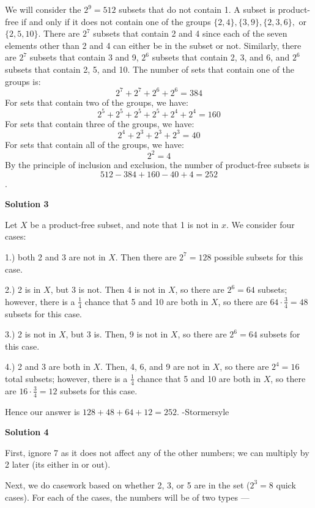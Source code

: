 \begin{enumerate}
We will consider the $2^9 = 512$ subsets that do not contain 1. A subset is product-free if and only if it does not contain one of the groups $\{2, 4\}, \{3, 9\}, \{2, 3, 6\},$ or $\{2, 5, 10\}$. There are $2^7$ subsets that contain 2 and 4 since each of the seven elements other than 2 and 4 can either be in the subset or not. Similarly, there are $2^7$ subsets that contain 3 and 9, $2^6$ subsets that contain 2, 3, and 6, and $2^6$ subsets that contain 2, 5, and 10. The number of sets that contain one of the groups is:
 \[2^7 + 2^7 + 2^6 + 2^6 = 384\]For sets that contain two of the groups, we have:
 \[2^5 + 2^5 + 2^5 + 2^5 + 2^4 + 2^4 = 160\]For sets that contain three of the groups, we have:
 \[2^4 + 2^3 + 2^3 + 2^3 = 40\]For sets that contain all of the groups, we have:
 \[2^2 = 4\]By the principle of inclusion and exclusion, the number of product-free subsets is
 \[512 - 384 + 160 - 40 + 4 = \boxed{252}\].

 



\textbf{Solution 3}

Let $X$ be a product-free subset, and note that 1 is not in $x$. We consider four cases: 

 1.) both 2 and 3 are not in $X$. Then there are $2^7=128$ possible subsets for this case. 

 2.) 2 is in $X$, but 3 is not. Then 4 is not in $X$, so there are $2^6=64$ subsets; however, there is a $\frac{1}{4}$ chance that 5 and 10 are both in $X$, so there are $64\cdot \frac{3}{4}=48$ subsets for this case. 

 3.) 2 is not in $X$, but 3 is. Then, 9 is not in $X$, so there are $2^6=64$ subsets for this case. 

 4.) 2 and 3 are both in $X$. Then, 4, 6, and 9 are not in $X$, so there are $2^4=16$ total subsets; however, there is a $\frac{1}{4}$ chance that 5 and 10 are both in $X$, so there are $16\cdot \frac{3}{4}=12$ subsets for this case.

 Hence our answer is $128+48+64+12=\boxed{252}$. -Stormersyle

 



\textbf{Solution 4}

First, ignore 7 as it does not affect any of the other numbers; we can multiply by 2 later (its either in or out).

 Next, we do casework based on whether 2, 3, or 5 are in the set ($2^3 = 8$ quick cases). For each of the cases, the numbers will be of two types --- 


\end{enumerate}

